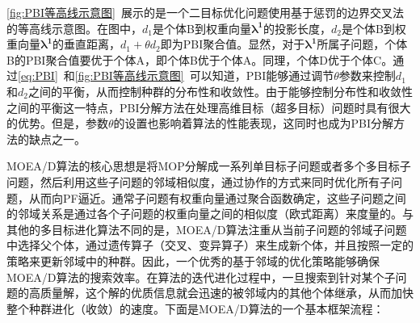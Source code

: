 \begin{enumerate}
\begin{figure}[htb]
        \label{fig:PBI等高线示意图}
    \end{figure}
    \par
    \autoref{fig:PBI等高线示意图}~展示的是一个二目标优化问题使用基于惩罚的边界交叉法的等高线示意图。在图中，$d_1$是个体B到权重向量$\boldsymbol{\lambda^1}$的投影长度，$d_2$是个体B到权重向量$\boldsymbol{\lambda^1}$的垂直距离，$d_1+\theta d_2$即为PBI聚合值。显然，对于$\boldsymbol{\lambda^1}$所属子问题，个体B的PBI聚合值要优于个体A，即个体B优于个体A。同理，个体D优于个体C。通过\autoref{eq:PBI}~和\autoref{fig:PBI等高线示意图}~可以知道，PBI能够通过调节$\theta$参数来控制$d_1$和$d_2$之间的平衡，从而控制种群的分布性和收敛性。由于能够控制分布性和收敛性之间的平衡这一特点，PBI分解方法在处理高维目标（超多目标）问题时具有很大的优势。但是，参数$\theta$的设置也影响着算法的性能表现，这同时也成为PBI分解方法的缺点之一。
\end{enumerate}
\par
MOEA/D算法的核心思想是将MOP分解成一系列单目标子问题或者多个多目标子问题，然后利用这些子问题的邻域相似度，通过协作的方式来同时优化所有子问题，从而向PF逼近。通常子问题有权重向量通过聚合函数确定，这些子问题之间的邻域关系是通过各个子问题的权重向量之间的相似度（欧式距离）来度量的。与其他的多目标进化算法不同的是，MOEA/D算法注重从当前子问题的邻域子问题中选择父个体，通过遗传算子（交叉、变异算子）来生成新个体，并且按照一定的策略来更新邻域中的种群。因此，一个优秀的基于邻域的优化策略能够确保MOEA/D算法的搜索效率。在算法的迭代进化过程中，一旦搜索到针对某个子问题的高质量解，这个解的优质信息就会迅速的被邻域内的其他个体继承，从而加快整个种群进化（收敛）的速度。下面是MOEA/D算法的一个基本框架流程：
